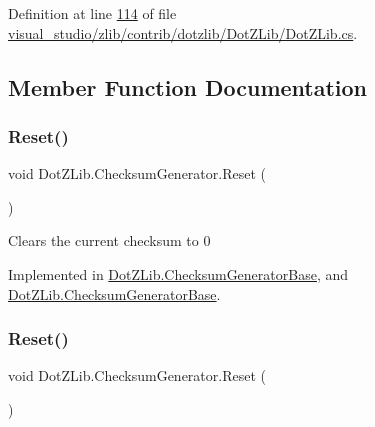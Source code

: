 Definition at line \hyperlink{visual__studio_2zlib_2contrib_2dotzlib_2_dot_z_lib_2_dot_z_lib_8cs_source_l00114}{114} of file \hyperlink{visual__studio_2zlib_2contrib_2dotzlib_2_dot_z_lib_2_dot_z_lib_8cs_source}{visual\+\_\+studio/zlib/contrib/dotzlib/\+Dot\+Z\+Lib/\+Dot\+Z\+Lib.\+cs}.



\subsection{Member Function Documentation}
\mbox{\label{interface_dot_z_lib_1_1_checksum_generator_ad01fdc9c4b4e5512dec8bc5072d97ffb}} 
\subsubsection{\texorpdfstring{Reset()}{Reset()}\hspace{0.1cm}{\footnotesize\ttfamily [1/2]}}
{\footnotesize\ttfamily void Dot\+Z\+Lib.\+Checksum\+Generator.\+Reset (\begin{DoxyParamCaption}{ }\end{DoxyParamCaption})}



Clears the current checksum to 0 



Implemented in \hyperlink{class_dot_z_lib_1_1_checksum_generator_base_a78ec9de09223c6f9f81e4a32d8d00b70}{Dot\+Z\+Lib.\+Checksum\+Generator\+Base}, and \hyperlink{class_dot_z_lib_1_1_checksum_generator_base_a78ec9de09223c6f9f81e4a32d8d00b70}{Dot\+Z\+Lib.\+Checksum\+Generator\+Base}.

\mbox{\label{interface_dot_z_lib_1_1_checksum_generator_ad01fdc9c4b4e5512dec8bc5072d97ffb}} 
\subsubsection{\texorpdfstring{Reset()}{Reset()}\hspace{0.1cm}{\footnotesize\ttfamily [2/2]}}
{\footnotesize\ttfamily void Dot\+Z\+Lib.\+Checksum\+Generator.\+Reset (\begin{DoxyParamCaption}{ }\end{DoxyParamCaption})}



